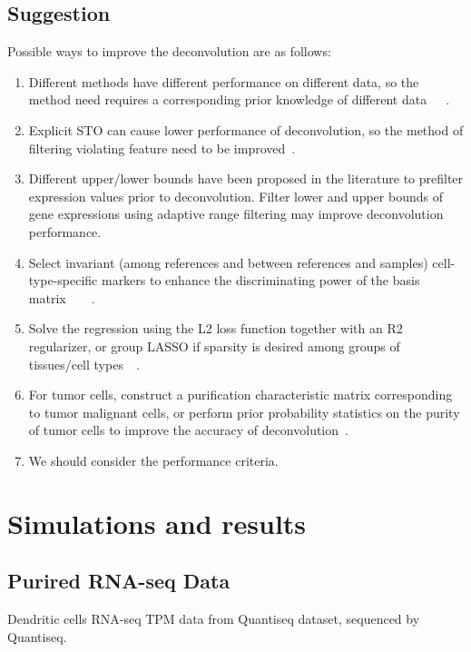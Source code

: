 \documentclass{article}
\begin{document}
\subsection{Suggestion}
Possible ways to improve the deconvolution are as follows:
\begin{enumerate}
\item Different methods have different performance on different data, so the method need requires a corresponding prior knowledge of different data~\cite{Qiao2012PERT}~\cite{Liebner2014MMAD}~\cite{Lehmusvaara2010Probabilistic}. 

\item Explicit STO can cause lower performance of deconvolution, so the method of filtering violating feature need to be improved~\cite{Mohammadi2017A}.

\item Different upper/lower bounds have been proposed in the literature to prefilter expression values prior to deconvolution. Filter lower and upper bounds of gene expressions using adaptive range filtering may improve deconvolution performance\cite{Mohammadi2017A}.

\item Select invariant (among references and between references and samples) cell-type-specific markers to enhance the discriminating power of the basis matrix~\cite{Mohammadi2017A}~\cite{Newman2015Robust}~\cite{Yi2013Digital}~\cite{Liebner2014MMAD}.

\item Solve the regression using the L2 loss function together with an R2 regularizer, or group LASSO if sparsity is desired among groups of tissues/cell types~\cite{Mohammadi2017A}~\cite{Newman2015Robust}.

\item For tumor cells, construct a purification characteristic matrix corresponding to tumor malignant cells, or perform prior probability statistics on the purity of tumor cells to improve the accuracy of deconvolution~\cite{Yi2013Digital}\cite{Bo2016Comprehensive}.

\item We should consider the performance criteria.
\end{enumerate}


\section{Simulations and results}

\subsection{Purired RNA-seq Data}
 Dendritic cells RNA-seq TPM data from Quantiseq dataset, sequenced by Quantiseq.
\end{document}
